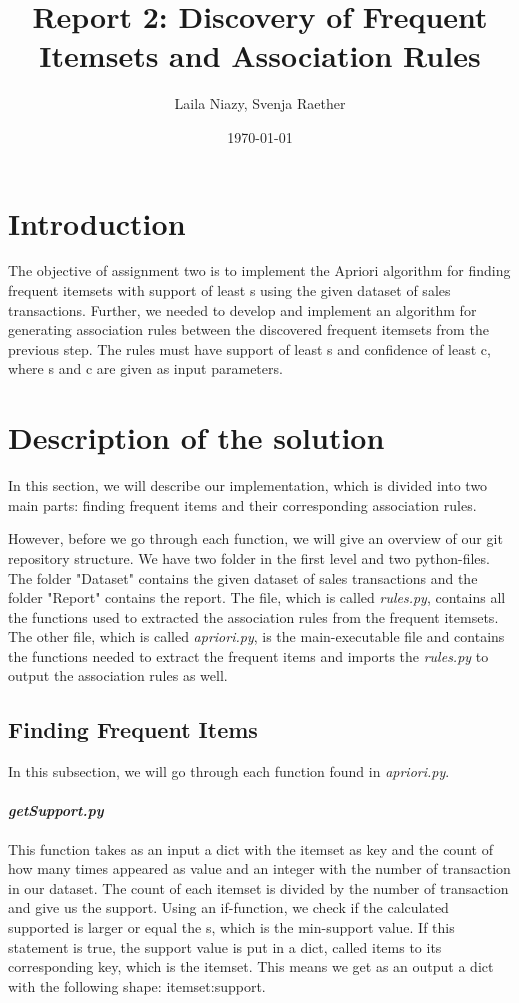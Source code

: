 \documentclass[a4paper, 11pt]{article}
\title{Report 2: Discovery of Frequent Itemsets and Association Rules }
\author{Laila Niazy, Svenja Raether}
\date{\today{}}
\begin{document}
\maketitle

\section{Introduction}

The objective of assignment two is to implement the Apriori algorithm for finding frequent itemsets with support of least s using the given dataset of sales transactions. Further, we needed to develop and implement an algorithm for generating association rules between the discovered frequent itemsets from the previous step. The rules must have support of least s and confidence of least c, where s and c are given as input parameters.

\section{Description of the solution}

In this section, we will describe our implementation, which is divided into two main parts: finding frequent items and their corresponding association rules. \newline

However, before we go through each function, we will give an overview of our git repository structure.
We have two folder in the first level and two python-files. The folder "Dataset" contains the given dataset of sales transactions and the folder "Report" contains the report. The file, which is called \textit{rules.py}, contains all the functions used to extracted the association rules from the frequent itemsets. The other file, which is called \textit{apriori.py}, is the main-executable file and contains the functions needed to extract the frequent items and imports the \textit{rules.py} to output the association rules as well.

\subsection{Finding Frequent Items}
In this subsection, we will go through each function found in \textit{apriori.py}.

\paragraph{\textit{getSupport.py}}
This function takes as an input a dict with the itemset as key and the count of how many times appeared as value and an integer with the number of transaction in our dataset.
The count of each itemset is divided by the number of transaction and give us the support. Using an if-function, we check if the calculated supported is larger or equal the s, which is the min-support value. If this statement is true, the support value is put in a dict, called items to its corresponding key, which is the itemset. This means we get as an output a dict with the following shape: {itemset:support}.
\end{document}
